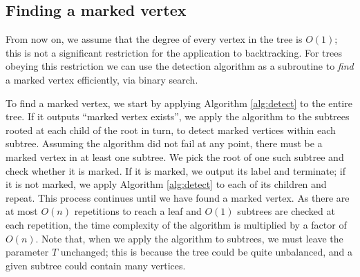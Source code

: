 \documentclass[11pt]{article}
\begin{document}

\subsection{Finding a marked vertex}
\label{sec:finding}

From now on, we assume that the degree of every vertex in the tree is $O(1)$; this is not a significant restriction for the application to backtracking. For trees obeying this restriction we can use the detection algorithm as a subroutine to {\em find} a marked vertex efficiently, via binary search.

To find a marked vertex, we start by applying Algorithm \ref{alg:detect} to the entire tree. If it outputs ``marked vertex exists'', we apply the algorithm to the subtrees rooted at each child of the root in turn, to detect marked vertices within each subtree. Assuming the algorithm did not fail at any point, there must be a marked vertex in at least one subtree. We pick the root of one such subtree and check whether it is marked. If it is marked, we output its label and terminate; if it is not marked, we apply Algorithm \ref{alg:detect} to each of its children and repeat. This process continues until we have found a marked vertex. As there are at most $O(n)$ repetitions to reach a leaf and $O(1)$ subtrees are checked at each repetition, the time complexity of the algorithm is multiplied by a factor of $O(n)$. Note that, when we apply the algorithm to subtrees, we must leave the parameter $T$ unchanged; this is because the tree could be quite unbalanced, and a given subtree could contain many vertices.
\end{document}
